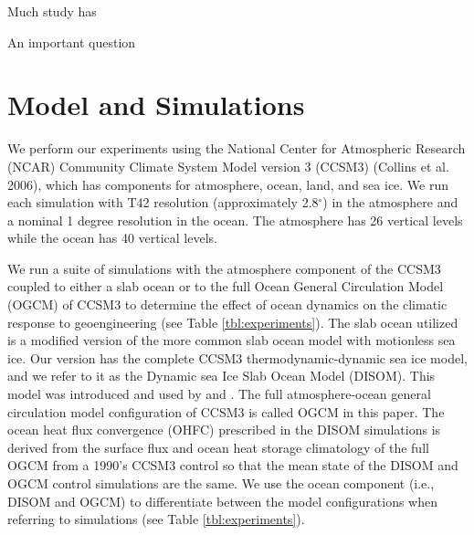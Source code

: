 \documentclass[12pt]{article}
\newcommand{\chapdef}{\section} %
\begin{document}
Much study has 

An important question

\chapdef{Model and Simulations}
\label{sec:methods}
We perform our experiments using the National Center for Atmospheric Research (NCAR) Community Climate System Model version 3 (CCSM3) (Collins et al. 2006), which has components for atmosphere, ocean, land, and sea ice. We run each simulation with T42 resolution (approximately 2.8$^\circ$) in the atmosphere and a nominal 1 degree resolution in the ocean. The atmosphere has 26 vertical levels while the ocean has 40 vertical levels. 

We run a suite of simulations with the atmosphere component of the CCSM3 coupled to either a slab ocean or to the full Ocean General Circulation Model (OGCM) of CCSM3 to determine the effect of ocean dynamics on the climatic response to geoengineering (see Table \ref{tbl:experiments}). The slab ocean utilized is a modified version of the more common slab ocean model with motionless sea ice. Our version has the complete CCSM3 thermodynamic-dynamic sea ice model, and we refer to it as the Dynamic sea Ice Slab Ocean Model (DISOM). This model was introduced and used by \cite{holland06} and \cite{bitz06}. The full atmosphere-ocean general circulation model configuration of CCSM3 is called OGCM in this paper. The ocean heat flux convergence (OHFC) prescribed in the DISOM simulations is derived from the surface flux and ocean heat storage climatology of the full OGCM from a 1990's CCSM3 control so that the mean state of the DISOM and OGCM control simulations are the same. We use the ocean component (i.e., DISOM and OGCM) to differentiate between the model configurations when referring to simulations (see Table \ref{tbl:experiments}). 
\end{document}

